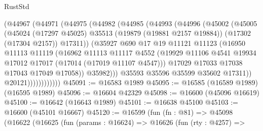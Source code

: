 \begin{lexlean}{RustStd}
\begin{coremodule}
                    (@44967
                      (@44971
                        (@44975
                          (@44982
                            (@44985
                              (@44993
                                (@44996
                                  (@45002
                                    (@45005
                                      (@45024
                                        (@17297 @45025)
                                        @35513
                                        (@19879 (@19881 @2157 @19884))
                                        (@17302 (@17304 @2157))
                                        @17311))
                                    (@35927
                                      @690
                                      @17
                                      @19
                                      @11121
                                      @11123
                                      (@16950
                                        @11113
                                        @11119
                                        (@16962
                                          @11113
                                          @11117
                                          @4552
                                          (@19929
                                            @11106
                                            @4541
                                            @19934
                                            @17012
                                            @17017
                                            (@17014 (@17019 @11107 @4547)))
                                          @17029
                                          @17033
                                          @17038
                                          @17043
                                          @17049
                                          @17058))
                                      @35982)))
                                @35593
                                @35596
                                @35599
                                @35602
                                @17311))
                            @20121))))))))))))
@45091 := @16583 @1989
@45095 := @16585 (@16589 @1989) (@16595 @1989)
@45096 := @16604 @42329
@45098 := @16600 (@45096 @16619)
@45100 := @16642 (@16643 @1989)
@45101 := @16638 @45100
@45103 := @16600 (@45101 @16667)
@45120 := @16599
    (fun (fn : @81) =>
    @45098
      (@16622
        (@16625
          (fun (params : @16624) =>
          @16626
            (fun (rty : @4257) =>

\end{coremodule}
\end{lexlean}
